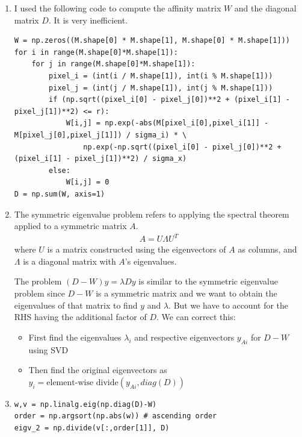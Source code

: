 \documentclass[11pt]{article}
\begin{document}
\begin{solution}
\begin{enumerate}
\item I used the following code to compute the affinity matrix $W$ and the diagonal matrix $D$. It is very inefficient.
    \begin{verbatim}
W = np.zeros((M.shape[0] * M.shape[1], M.shape[0] * M.shape[1]))
for i in range(M.shape[0]*M.shape[1]):
    for j in range(M.shape[0]*M.shape[1]):
        pixel_i = (int(i / M.shape[1]), int(i % M.shape[1]))
        pixel_j = (int(j / M.shape[1]), int(j % M.shape[1]))
        if (np.sqrt((pixel_i[0] - pixel_j[0])**2 + (pixel_i[1] - pixel_j[1])**2) <= r):
            W[i,j] = np.exp(-abs(M[pixel_i[0],pixel_i[1]] - M[pixel_j[0],pixel_j[1]]) / sigma_i) * \
                np.exp(-np.sqrt((pixel_i[0] - pixel_j[0])**2 + (pixel_i[1] - pixel_j[1])**2) / sigma_x)
        else:
            W[i,j] = 0
D = np.sum(W, axis=1)
\end{verbatim}

\item The symmetric eigenvalue problem refers to applying the spectral theorem applied to a symmetric matrix $A$.
\begin{align*}
    A = U \Lambda U^T
\end{align*}
where $U$ is a matrix constructed using the eigenvectors of $A$ as columns, and $\Lambda$ is a diagonal matrix with $A$'s eigenvalues.

The problem $(D-W)y = \lambda D y$ is similar to the symmetric eigenvalue problem since $D-W$ is a symmetric matrix and we want to obtain the eigenvalues of that matrix to find $y$ and $\lambda$. But we have to account for the RHS having the additional factor of $D$. We can correct this:

\begin{itemize}
    \item First find the eigenvalues $\lambda_i$ and respective eigenvectors $y_{Ai}$ for $D-W$ using SVD
    \item Then find the original eigenvectors as $y_i = \text{element-wise divide}(y_{Ai}, diag(D))$
\end{itemize}

\item
\begin{verbatim}
w,v = np.linalg.eig(np.diag(D)-W)
order = np.argsort(np.abs(w)) # ascending order
eigv_2 = np.divide(v[:,order[1]], D)
\end{verbatim}


\end{enumerate}
\end{solution}
\end{document}
